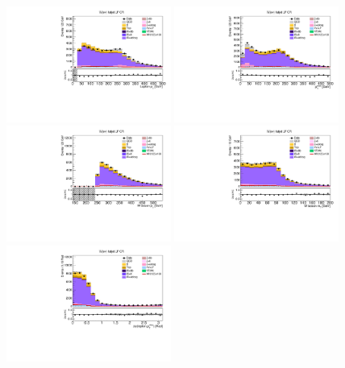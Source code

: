 \begin{figure}[tbp]
  \begin{center}
    \includegraphics[width=0.48\textwidth]{figures/wlnhbb2016/boosted/WenWHLightFlavorFJCR_lepton1Pt.pdf}
    \includegraphics[width=0.48\textwidth]{figures/wlnhbb2016/boosted/WenWHLightFlavorFJCR_pfmet.pdf}
    \includegraphics[width=0.48\textwidth]{figures/wlnhbb2016/boosted/WenWHLightFlavorFJCR_topWBosonPt.pdf}
    \includegraphics[width=0.48\textwidth]{figures/wlnhbb2016/boosted/WenWHLightFlavorFJCR_mT.pdf}
    \includegraphics[width=0.48\textwidth]{figures/wlnhbb2016/boosted/WenWHLightFlavorFJCR_deltaPhiLep1Met.pdf}

\end{center}
\end{figure}
